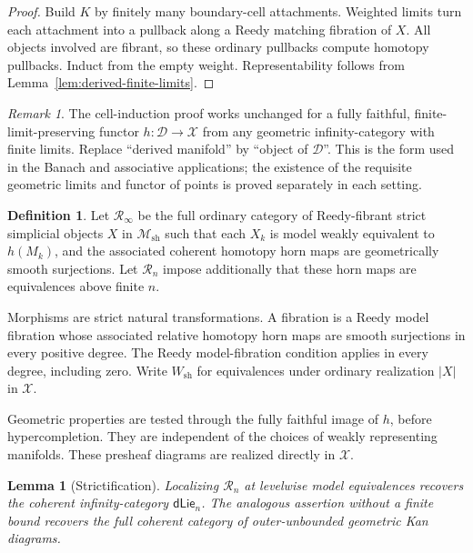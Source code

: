 \documentclass[12pt]{amsart}
\newtheorem{lem}[thm]{Lemma}
\theoremstyle{definition}
\newtheorem{defn}[thm]{Definition}
\theoremstyle{remark}
\newtheorem{rem}[thm]{Remark}
\numberwithin{equation}{section}
\newcommand{\CM}{\mathcal M}
\newcommand{\dLie}{\mathsf{dLie}}
\begin{document}
\begin{proof}
Build $K$ by finitely many boundary-cell attachments.
Weighted limits turn each attachment into a pullback along
a Reedy matching fibration of $X$. All objects involved are
fibrant, so these ordinary pullbacks compute homotopy pullbacks.
Induct from the empty weight. Representability follows from
Lemma~\ref{lem:derived-finite-limits}.
\end{proof}

\begin{rem}\label{rem:generic-weighted-matching}
The cell-induction proof works unchanged for a fully faithful,
finite-limit-preserving functor $h:\mathcal D\to\mathcal X$
from any geometric infinity-category with finite limits.
Replace ``derived manifold'' by ``object of $\mathcal D$''.
This is the form used in the Banach and associative applications;
the existence of the requisite geometric limits and functor of
points is proved separately in each setting.
\end{rem}

\begin{defn}\label{def:derived-reedy-models}
Let $\mathscr R_\infty$ be the full ordinary category of
Reedy-fibrant strict simplicial objects $X$ in
$\CM_{\mathrm{sh}}$ such that each $X_k$ is model weakly
equivalent to $h(M_k)$, and the associated coherent homotopy
horn maps are geometrically smooth surjections.
Let $\mathscr R_n$ impose additionally that these horn maps
are equivalences above finite $n$.

Morphisms are strict natural transformations. A fibration
is a Reedy model fibration whose associated relative
homotopy horn maps are smooth surjections in every positive
degree. The Reedy model-fibration condition applies in every
degree, including zero. Write $W_{\mathrm{sh}}$ for equivalences
under ordinary realization $|X|$ in $\mathcal X$.
\end{defn}

Geometric properties are tested through the fully faithful
image of $h$, before hypercompletion. They are independent
of the choices of weakly representing manifolds.
These presheaf diagrams are realized directly in $\mathcal X$.

\begin{lem}[Strictification]\label{lem:derived-strictification}
Localizing $\mathscr R_n$ at levelwise model equivalences
recovers the coherent infinity-category $\dLie_n$.
The analogous assertion without a finite bound recovers
the full coherent category of outer-unbounded geometric
Kan diagrams.
\end{lem}
\end{document}
